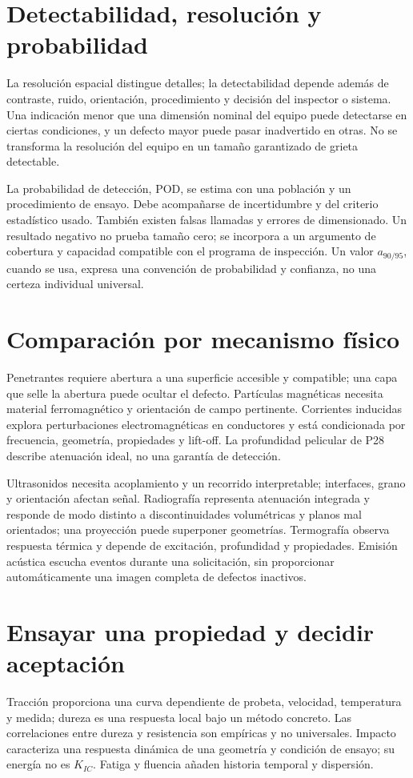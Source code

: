 
\section{Detectabilidad, resolución y probabilidad}
La resolución espacial distingue detalles; la detectabilidad depende además de contraste, ruido, orientación, procedimiento y decisión del inspector o sistema. Una indicación menor que una dimensión nominal del equipo puede detectarse en ciertas condiciones, y un defecto mayor puede pasar inadvertido en otras. No se transforma la resolución del equipo en un tamaño garantizado de grieta detectable.

La probabilidad de detección, POD, se estima con una población y un procedimiento de ensayo. Debe acompañarse de incertidumbre y del criterio estadístico usado. También existen falsas llamadas y errores de dimensionado. Un resultado negativo no prueba tamaño cero; se incorpora a un argumento de cobertura y capacidad compatible con el programa de inspección. Un valor $a_{90/95}$, cuando se usa, expresa una convención de probabilidad y confianza, no una certeza individual universal.
\section{Comparación por mecanismo físico}
Penetrantes requiere abertura a una superficie accesible y compatible; una capa que selle la abertura puede ocultar el defecto. Partículas magnéticas necesita material ferromagnético y orientación de campo pertinente. Corrientes inducidas explora perturbaciones electromagnéticas en conductores y está condicionada por frecuencia, geometría, propiedades y lift-off. La profundidad pelicular de P28 describe atenuación ideal, no una garantía de detección.

Ultrasonidos necesita acoplamiento y un recorrido interpretable; interfaces, grano y orientación afectan señal. Radiografía representa atenuación integrada y responde de modo distinto a discontinuidades volumétricas y planos mal orientados; una proyección puede superponer geometrías. Termografía observa respuesta térmica y depende de excitación, profundidad y propiedades. Emisión acústica escucha eventos durante una solicitación, sin proporcionar automáticamente una imagen completa de defectos inactivos.
\Needspace{.48\textheight}
\section{Ensayar una propiedad y decidir aceptación}
Tracción proporciona una curva dependiente de probeta, velocidad, temperatura y medida; dureza es una respuesta local bajo un método concreto. Las correlaciones entre dureza y resistencia son empíricas y no universales. Impacto caracteriza una respuesta dinámica de una geometría y condición de ensayo; su energía no es $K_{IC}$. Fatiga y fluencia añaden historia temporal y dispersión.

